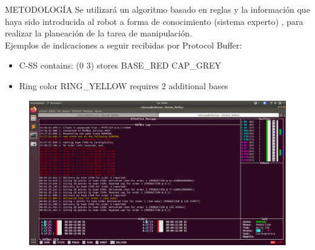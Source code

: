 \documentclass[handout,t]{beamer}
\begin{document}
\begin{frame}{METODOLOGÍA}
Se utilizará un algoritmo basado en reglas y la información que haya sido introducida al robot a forma de conocimiento (sistema experto) \cite{giarratano_expert_2006}, para realizar la planeación de la tarea de manipulación. \\
Ejemplos de indicaciones a seguir recibidas por Protocol Buffer:
\begin{itemize}
    \item C-SS contains: (0 3) stores BASE\_RED CAP\_GREY
    \item Ring color RING\_YELLOW requires 2 additional bases
\end{itemize}
\begin{figure}[htp]
    \centering
    \includegraphics[scale=0.1]{NewFigures/Refbox_1.png}
\end{figure}
\end{frame}
\end{document}
